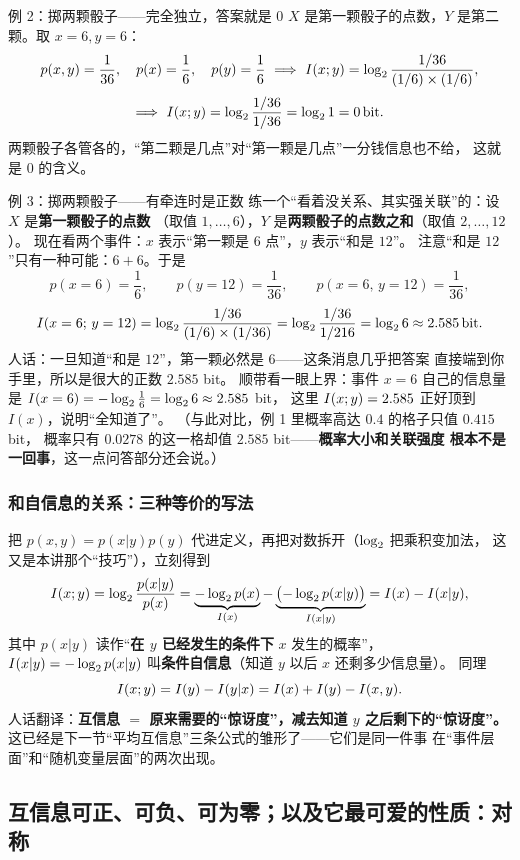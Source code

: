 \begin{calc}{例 2：掷两颗骰子——完全独立，答案就是 $0$}
$X$ 是第一颗骰子的点数，$Y$ 是第二颗。取 $x=6,y=6$：
\[
p(x,y)=\frac1{36},\quad p(x)=\frac16,\quad p(y)=\frac16
\ \Longrightarrow\
I\!\left(x;y\right)=\log_{2}\frac{1/36}{(1/6)\times(1/6)},
\]
\[
\Longrightarrow\ I\!\left(x;y\right)=\log_{2}\frac{1/36}{1/36}=\log_{2} 1=0\,\text{bit} .
\]
两颗骰子各管各的，“第二颗是几点”对“第一颗是几点”一分钱信息也不给，
这就是 $0$ 的含义。
\end{calc}

\begin{calc}{例 3：掷两颗骰子——有牵连时是正数}
练一个“看着没关系、其实强关联”的：设 $X$ 是\textbf{第一颗骰子的点数}
（取值 $1,\dots,6$），$Y$ 是\textbf{两颗骰子的点数之和}（取值 $2,\dots,12$）。
现在看两个事件：$x$ 表示“第一颗是 $6$ 点”，$y$ 表示“和是 $12$”。
注意“和是 $12$”只有一种可能：$6+6$。于是
\[
p(x=6)=\frac16,\qquad p(y=12)=\frac1{36},\qquad p(x=6,\,y=12)=\frac1{36},
\]
\[
I\!\left(x=6;\,y=12\right)=\log_{2}\frac{1/36}{(1/6)\times(1/36)}
=\log_{2}\frac{1/36}{1/216}=\log_{2} 6\approx2.585\,\text{bit} .
\]
人话：一旦知道“和是 $12$”，第一颗必然是 $6$——这条消息几乎把答案
直接端到你手里，所以是很大的正数 $2.585$ bit。
顺带看一眼上界：事件 $x=6$ 自己的信息量是 $I(x=6)=-\log_{2}\frac16=\log_{2} 6\approx2.585$ bit，
这里 $I\!\left(x;y\right)=2.585$ 正好顶到 $I(x)$，说明“全知道了”。
（与此对比，例 1 里概率高达 $0.4$ 的格子只值 $0.415$ bit，
概率只有 $0.0278$ 的这一格却值 $2.585$ bit——\textbf{概率大小和关联强度
根本不是一回事}，这一点问答部分还会说。）
\end{calc}

\subsubsection{和自信息的关系：三种等价的写法}

把 $p(x,y)=p(x|y)p(y)$ 代进定义，再把对数拆开（$\log_{2}$ 把乘积变加法，
这又是本讲那个“技巧”），立刻得到
\[
I\!\left(x;y\right)=\log_{2}\frac{p(x|y)}{p(x)}
=\underbrace{-\log_{2} p(x)}_{I(x)}-\underbrace{\bigl(-\log_{2} p(x|y)\bigr)}_{I(x|y)}
=I(x)-I(x|y),
\]
其中 $p(x|y)$ 读作“\textbf{在 $y$ 已经发生的条件下} $x$ 发生的概率”，
$I(x|y)=-\log_{2} p(x|y)$ 叫\textbf{条件自信息}（知道 $y$ 以后 $x$ 还剩多少信息量）。
同理
\[
I\!\left(x;y\right)=I(y)-I(y|x)=I(x)+I(y)-I(x,y).
\]
人话翻译：\textbf{互信息 $=$ 原来需要的“惊讶度”，减去知道 $y$ 之后剩下的“惊讶度”。}
这已经是下一节“平均互信息”三条公式的雏形了——它们是同一件事
在“事件层面”和“随机变量层面”的两次出现。

\subsection{互信息可正、可负、可为零；以及它最可爱的性质：对称}


